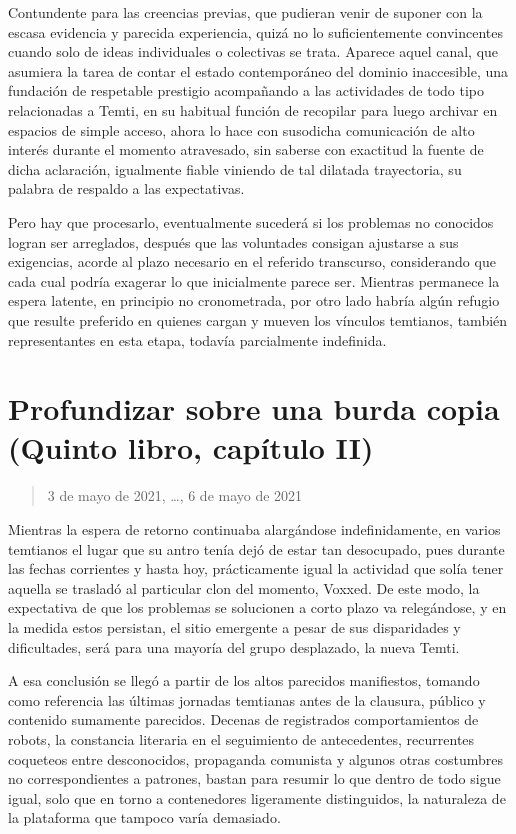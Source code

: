 \documentclass[
]{book}
\begin{document}
Contundente para las creencias previas, que pudieran venir de suponer con la escasa evidencia y parecida experiencia, quizá no lo suficientemente convincentes cuando solo de ideas individuales o colectivas se trata. Aparece aquel canal, que asumiera la tarea de contar el estado contemporáneo del dominio inaccesible, una fundación de respetable prestigio acompañando a las actividades de todo tipo relacionadas a Temti, en su habitual función de recopilar para luego archivar en espacios de simple acceso, ahora lo hace con susodicha comunicación de alto interés durante el momento atravesado, sin saberse con exactitud la fuente de dicha aclaración, igualmente fiable viniendo de tal dilatada trayectoria, su palabra de respaldo a las expectativas.

Pero hay que procesarlo, eventualmente sucederá si los problemas no conocidos logran ser arreglados, después que las voluntades consigan ajustarse a sus exigencias, acorde al plazo necesario en el referido transcurso, considerando que cada cual podría exagerar lo que inicialmente parece ser. Mientras permanece la espera latente, en principio no cronometrada, por otro lado habría algún refugio que resulte preferido en quienes cargan y mueven los vínculos temtianos, también representantes en esta etapa, todavía parcialmente indefinida.

\hypertarget{profundizar-sobre-una-burda-copia-quinto-libro-capuxedtulo-ii}{%
\section{Profundizar sobre una burda copia (Quinto libro, capítulo II)}\label{profundizar-sobre-una-burda-copia-quinto-libro-capuxedtulo-ii}}

\begin{quote}
3 de mayo de 2021, \ldots, 6 de mayo de 2021
\end{quote}

Mientras la espera de retorno continuaba alargándose indefinidamente, en varios temtianos el lugar que su antro tenía dejó de estar tan desocupado, pues durante las fechas corrientes y hasta hoy, prácticamente igual la actividad que solía tener aquella se trasladó al particular clon del momento, Voxxed. De este modo, la expectativa de que los problemas se solucionen a corto plazo va relegándose, y en la medida estos persistan, el sitio emergente a pesar de sus disparidades y dificultades, será para una mayoría del grupo desplazado, la nueva Temti.

A esa conclusión se llegó a partir de los altos parecidos manifiestos, tomando como referencia las últimas jornadas temtianas antes de la clausura, público y contenido sumamente parecidos. Decenas de registrados comportamientos de robots, la constancia literaria en el seguimiento de antecedentes, recurrentes coqueteos entre desconocidos, propaganda comunista y algunos otras costumbres no correspondientes a patrones, bastan para resumir lo que dentro de todo sigue igual, solo que en torno a contenedores ligeramente distinguidos, la naturaleza de la plataforma que tampoco varía demasiado.
\end{document}
